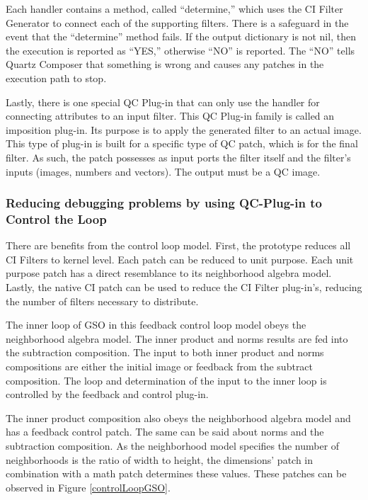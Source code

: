 \documentclass[11pt]{article}
\begin{document}
Each handler contains a method, called ``determine,'' which uses the CI Filter Generator to connect each of the supporting filters.  There is a safeguard in the event that the ``determine'' method fails.     If the output dictionary is not nil, then the execution is reported as ``YES,'' otherwise ``NO'' is reported.  The ``NO'' tells Quartz Composer that something is wrong and causes any patches in the execution path to stop.  

Lastly, there is one special QC Plug-in that can only use the handler for connecting  attributes to an input filter.  This QC Plug-in family is called an imposition plug-in.  Its purpose is to apply the generated filter to an actual image.  This type of plug-in is built for a specific type of QC patch, which is for the final filter.   As such, the patch possesses as input ports the filter itself and the filter's inputs (images, numbers and vectors).  The output must be a QC image. %


\subsubsection{Reducing debugging problems by using QC-Plug-in to Control the Loop}

There are benefits from the control loop model. First, the prototype reduces all CI Filters to kernel level.  Each patch can be reduced to unit purpose. Each unit purpose patch has a direct resemblance to its neighborhood algebra model. Lastly, the native CI patch can be used to reduce the CI Filter plug-in's, reducing the number of filters necessary to distribute.  
	
The inner loop of GSO in this feedback control loop model obeys the neighborhood algebra model.  The inner product and norms results are fed into the subtraction composition.  The input to both inner product and norms compositions are either the initial image or feedback from the subtract composition.  The loop and determination of the input to the inner loop is controlled by the feedback and control plug-in.  

The inner product composition also obeys the neighborhood algebra model and has a feedback control patch.  The same can be said about norms and the subtraction composition.  As the neighborhood model specifies the number of neighborhoods is the ratio of width to height, the dimensions' patch in combination with a math patch determines these values.   These patches can be observed in Figure \ref{controlLoopGSO}.   
\end{document}
